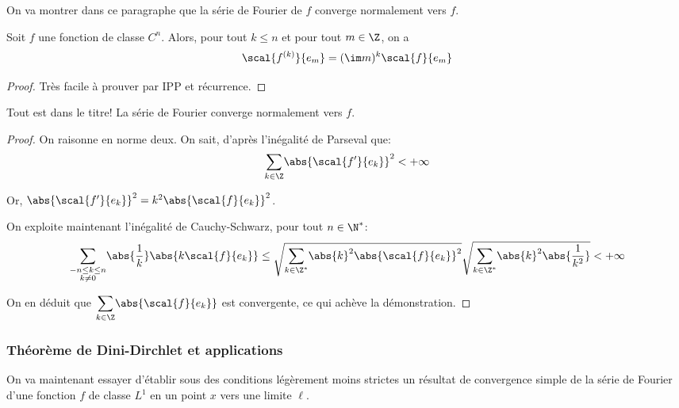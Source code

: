 On va montrer dans ce paragraphe que la série de Fourier de $f$ converge normalement vers $f$.


\begin{prop}
Soit $f$ une fonction de classe $C^n$. Alors, pour tout $k \leq n$ et pour tout $m \in \Z$, on a
\[
\scal{f^{(k)}}{e_m} = (\im m)^k \scal{f}{e_m}
\]
\end{prop}

\begin{proof}
Très facile à prouver par IPP et récurrence.
\end{proof}


\begin{prop}
Tout est dans le titre! La série de Fourier converge normalement vers $f$.
\end{prop}


\begin{proof}
On raisonne en norme deux. On sait, d'après l'inégalité de Parseval que:
\[
\displaystyle{\sum \limits_{k \in \Z}} \abs{\scal{f'}{e_k}}^2 < +\infty
\]

Or, $\abs{\scal{f'}{e_k}}^2 = k^2 \abs{\scal{f}{e_k}}^2$.

On exploite maintenant l'inégalité de Cauchy-Schwarz, pour tout $n \in \N^*$:
\[
\displaystyle{\sum \limits_{\substack{-n \leq k \leq n \\ k \neq 0}}} \abs{\frac{1}{k}} \abs{ k \scal{f}{e_k}} \leq \sqrt{\displaystyle{\sum \limits_{k \in \Z^*}} \abs{k}^2 \abs{\scal{f}{e_k}}^2} \sqrt{\displaystyle{\sum \limits_{k \in \Z^*}} \abs{k}^2 \abs{\frac{1}{k^2}}} < +\infty
\]

On en déduit que $\displaystyle{\sum \limits_{k \in \Z}} \abs{\scal{f}{e_k}}$ est convergente, ce qui achève la démonstration.
\end{proof}

\subsubsection{Théorème de Dini-Dirchlet et applications}

On va maintenant essayer d'établir sous des conditions légèrement moins strictes un résultat de convergence simple de la série de Fourier d'une fonction $f$ de classe $L^1$ en un point $x$ vers une limite $\ell$.

